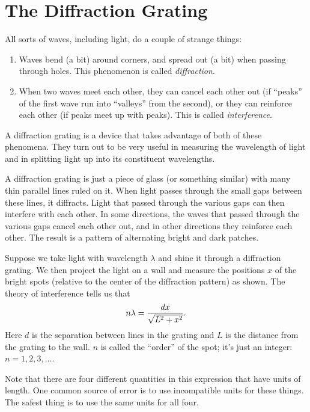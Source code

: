 \chapter{The Diffraction Grating}



All sorts of waves, including light, do a couple 
of strange things:
\begin{enumerate}
\item Waves bend (a bit) around corners, and spread
out (a bit) when passing through holes. 
This phenomenon is called {\it diffraction}.
\item When two waves meet each other, they
can cancel each other out (if ``peaks'' of the
first wave run into ``valleys'' from the second), 
or they can reinforce each other (if peaks meet up with peaks).
This is called {\it interference}.
\end{enumerate}

A diffraction grating is a device
that takes advantage of both of these phenomena.  They turn
out to be very useful in measuring the wavelength
of light and in splitting light up into its constituent
wavelengths.  

A diffraction grating is just a piece of glass (or something similar)
with many thin parallel lines ruled on it.  When light passes through
the small gaps between these lines, it diffracts.  Light that passed
through the various gaps can then interfere with each other.  In some
directions, the waves that passed through the various gaps cancel each
other out, and in other directions they reinforce each other.  The
result is a pattern of alternating bright and dark patches.

Suppose we take light with wavelength $\lambda$ and
shine it through a diffraction grating.  We then
project the light on a wall and measure the 
positions $x$ of the bright spots (relative to the
center of the diffraction pattern) as shown.  The theory of 
interference tells us that 
\begin{displaymath} n\lambda = {dx\over \sqrt{L^2+x^2}}.  \end{displaymath}
Here $d$ is the separation between lines in the grating and $L$
is the distance from the grating to the wall.  $n$ is called the
``order'' of the spot; it's just an integer: $n=1,2,3,\ldots$.

Note that there are four different quantities in this expression that
have units of length.  One common source of error is to
use incompatible units for these things.  The safest thing is
to use the same units for all four.

